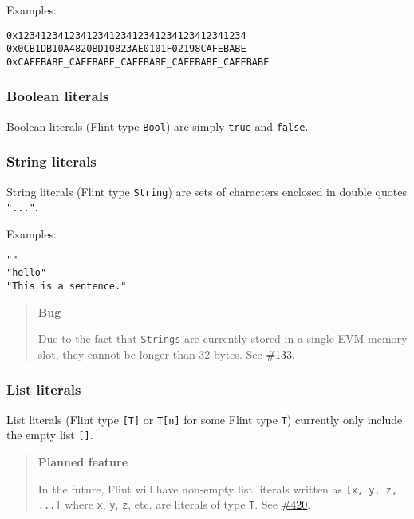 Examples:

\begin{verbatim}
0x1234123412341234123412341234123412341234
0x0CB1DB10A4820BD10823AE0101F02198CAFEBABE
0xCAFEBABE_CAFEBABE_CAFEBABE_CAFEBABE_CAFEBABE
\end{verbatim}

\subsubsection{Boolean literals}
\label{sec:appendix-b-boolean-literals}

Boolean literals (Flint type \texttt{Bool}) are simply \texttt{true} and \texttt{false}.

\subsubsection{String literals}
\label{sec:appendix-b-string-literals}

String literals (Flint type \texttt{String}) are sets of characters enclosed in double quotes \texttt{"..."}.

Examples:

\begin{verbatim}
""
"hello"
"This is a sentence."
\end{verbatim}

\begin{quote}
\textbf{Bug}

Due to the fact that \texttt{Strings} are currently stored in a single EVM memory slot, they cannot be longer than 32 bytes. See \href{https://github.com/flintrocks/flint/issues/133}{\#133}.
\end{quote}

\subsubsection{List literals}
\label{sec:appendix-b-list-literals}

List literals (Flint type \texttt{[T]} or \texttt{T[n]} for some Flint type \texttt{T}) currently only include the empty list \texttt{[]}.

\begin{quote}
\textbf{Planned feature}

In the future, Flint will have non-empty list literals written as \texttt{[x, y, z, ...]} where \texttt{x}, \texttt{y}, \texttt{z}, etc. are literals of type \texttt{T}. See \href{https://github.com/flintlang/flint/issues/420}{\#420}.
\end{quote}

